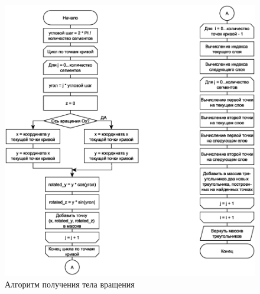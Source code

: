 \begin{figure}[H]
	\centering
	\includegraphics[scale=0.6]{img/rotate.eps}
	\caption{Алгоритм получения тела вращения}
	\label{fig:rotate}
\end{figure}

